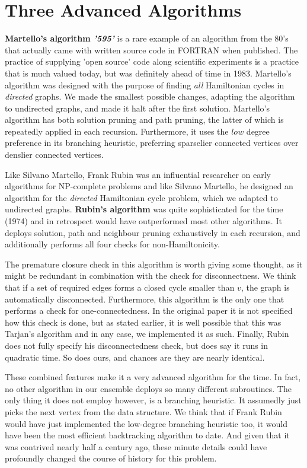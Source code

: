 \documentclass[10pt,conference,compsocconf]{IEEEtran}
\begin{document}
\section{Three Advanced Algorithms}
  
\noindent \textbf{Martello's algorithm \textit{'595'}} is a rare example of an algorithm from the 80's that actually came with written source code in FORTRAN when published. The practice of supplying 'open source' code along scientific experiments is a practice that is much valued today, but was definitely ahead of time in 1983. Martello's algorithm was designed with the purpose of finding \textit{all} Hamiltonian cycles in \textit{directed} graphs. We made the smallest possible changes, adapting the algorithm to undirected graphs, and made it halt after the first solution. Martello’s algorithm has both solution pruning and path pruning, the latter of which is repeatedly applied in each recursion. Furthermore, it uses the $low$ degree preference in its branching heuristic, preferring sparselier connected vertices over denslier connected vertices. 

Like Silvano Martello, Frank Rubin was an influential researcher on early algorithms for NP-complete problems and like Silvano Martello, he designed an algorithm for the \textit{directed} Hamiltonian cycle problem, which we adapted to undirected graphs. \textbf{Rubin's algorithm} was quite sophisticated for the time (1974) and in retrospect would have outperformed most other algorithms. It deploys solution,  path and neighbour pruning exhaustively in each recursion, and additionally performs all four checks for non-Hamiltonicity.

The premature closure check in this algorithm is worth giving some thought, as it might be redundant in combination with the check for disconnectness. We think that if a set of required edges forms a closed cycle smaller than $v$, the graph is automatically disconnected. Furthermore, this algorithm is the only one that performs a check for one-connectedness. In the original paper it is not specified how this check is done, but as stated earlier, it is well possible that this was Tarjan's algorithm and in any case, we implemented it as such. Finally, Rubin does not fully specify his disconnectedness check, but does say it runs in quadratic time. So does ours, and chances are they are nearly identical.

These combined features make it a very advanced algorithm for the time. In fact, no other algorithm in our ensemble deploys so many different subroutines. The only thing it does not employ however, is a branching heuristic. It assumedly just picks the next vertex from the data structure. We think that if Frank Rubin would have just implemented the low-degree branching heuristic too, it would have been the most efficient backtracking algorithm to date. And given that it was contrived nearly half a century ago, these minute details could have profoundly changed the course of history for this problem.
\end{document}
